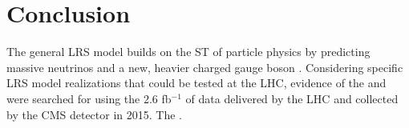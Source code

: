 \chapter{Conclusion}
\label{conclusion_chapter}
The general LRS model builds on the ST of particle physics by predicting massive neutrinos \nul and a new, heavier charged 
gauge boson \WR.  Considering specific LRS model realizations that could be tested at the LHC, evidence of the \WR and \nul 
were searched for using the 2.6 fb$^{-1}$ of data delivered by the LHC and collected by the CMS detector in 2015.  The .



